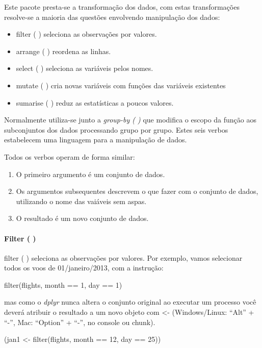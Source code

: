 \documentclass[
]{article}
\newenvironment{Shaded}{\begin{snugshade}}{\end{snugshade}}
\newcommand{\DecValTok}[1]{\textcolor[rgb]{0.00,0.00,0.81}{#1}}
\newcommand{\FunctionTok}[1]{\textcolor[rgb]{0.00,0.00,0.00}{#1}}
\newcommand{\NormalTok}[1]{#1}
\newcommand{\OtherTok}[1]{\textcolor[rgb]{0.56,0.35,0.01}{#1}}
\newcommand{\SpecialCharTok}[1]{\textcolor[rgb]{0.00,0.00,0.00}{#1}}
\begin{document}
Este pacote presta-se a transformação dos dados, com estas
transformações resolve-se a maioria das questões envolvendo manipulação
dos dados:

\begin{itemize}
\item
  filter ( ) seleciona as observações por valores.
\item
  arrange ( ) reordena as linhas.
\item
  select ( ) seleciona as variáveis pelos nomes.
\item
  mutate ( ) cria novas variáveis com funções das variáveis existentes
\item
  sumarise ( ) reduz as estatísticas a poucos valores.
\end{itemize}

Normalmente utiliza-se junto a \emph{group-by ( )} que modifica o escopo
da função aos subconjuntos dos dados processando grupo por grupo. Estes
seis verbos estabelecem uma linguagem para a manipulação de dados.

Todos os verbos operam de forma similar:

\begin{enumerate}
\def\labelenumi{\arabic{enumi}.}
\item
  O primeiro argumento é um conjunto de dados.
\item
  Os argumentos subsequentes descrevem o que fazer com o conjunto de
  dados, utilizando o nome das vaiáveis sem aspas.
\item
  O resultado é um novo conjunto de dados.
\end{enumerate}

\hypertarget{filter}{%
\paragraph{Filter ( )}\label{filter}}

filter ( ) seleciona as observações por valores. Por exemplo, vamos
selecionar todos os voos de 01/janeiro/2013, com a instrução:

filter(flights, month == 1, day == 1)

mas como o \emph{dplyr} nunca altera o conjunto original ao executar um
processo você deverá atribuir o resultado a um novo objeto com
\textless- (Windows/Linux: ``Alt'' + ``-'', Mac: ``Option'' + ``-'', no
console ou chunk).

\begin{Shaded}
\begin{Highlighting}[]
\NormalTok{(jan1 }\OtherTok{\textless{}{-}} \FunctionTok{filter}\NormalTok{(flights, month }\SpecialCharTok{==} \DecValTok{12}\NormalTok{, day }\SpecialCharTok{==} \DecValTok{25}\NormalTok{))}
\end{Highlighting}
\end{Shaded}
\end{document}

